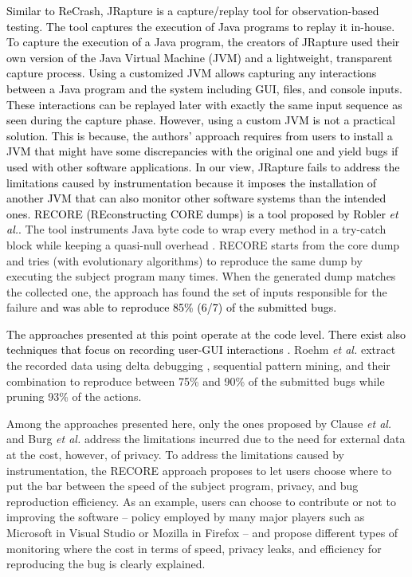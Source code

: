 \documentclass[times, doublespace]{smrauth}
\newcommand{\red}[1]{\textcolor{black}{#1}}
\begin{document}
\red{Similar to ReCrash, JRapture \cite{Steven2000} is a capture/replay tool for observation-based testing. The tool captures the execution of Java programs to replay it in-house. To capture the execution of a Java program, the creators of JRapture used their own version of the Java Virtual Machine (JVM) and a lightweight, transparent capture process.
Using a customized JVM allows capturing any interactions between a Java program and the system including GUI, files, and console inputs.
These interactions can be replayed later  with exactly the same input sequence as seen during the capture phase.
However, using a custom JVM is not a practical solution. This is because, the authors' approach requires from users to install a JVM that might have some discrepancies with the original one and yield bugs if used with other software applications.
In our view,  JRapture fails to address the limitations caused
by instrumentation because it imposes the installation of another
JVM that can also monitor other software systems than the intended ones.
RECORE (REconstructing CORE dumps) is a tool proposed by Robler {\it et al.}.} The tool instruments Java byte code to wrap every method in a try-catch block while keeping a quasi-null overhead \cite{Rossler2013}. RECORE starts from the core dump and tries (with evolutionary algorithms) to reproduce the same dump by executing the subject program many times. When the generated dump matches the collected one, the approach has found the set of inputs responsible for the failure \red{and was able to reproduce 85\% (6/7) of the submitted bugs.}

\red{The approaches presented at this point operate at the code level.
There exist also techniques that focus on recording user-GUI interactions \cite{Herbold2011,Roehm2015}.}
Roehm {\it et al.} extract the recorded data using delta debugging \cite{Zeller2002}, sequential pattern mining, and their combination to reproduce between 75\% and 90\% of the submitted bugs while pruning 93\% of the actions.

Among the approaches presented here, only the ones proposed by Clause {\it et al.} and Burg {\it et al.} address the limitations incurred due to the need for external data  at the cost, however, of privacy. To address the limitations caused by instrumentation,  the RECORE approach proposes to let users choose where to put the bar between the speed of the subject program, privacy, and bug reproduction efficiency. As an example, users can choose to contribute or not to improving the software -- policy employed by many major players such as Microsoft in Visual Studio or Mozilla in Firefox -- and propose different types of monitoring where the cost in terms of speed, privacy leaks, and efficiency for reproducing the bug is clearly explained.
\end{document}
